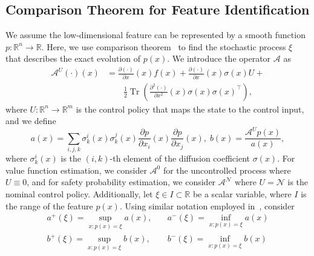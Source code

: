 \documentclass[letterpaper]{article} %
\begin{document}
\subsection{Comparison Theorem for Feature Identification}
We assume the low-dimensional feature can be represented by a smooth function $p: \mathbb{R}^n \rightarrow \mathbb{R}$. Here, we use comparison theorem~\cite[Theorem 3.1]{ikeda1977comparison} to find the stochastic process $\xi$ that describes the exact evolution of $p(x)$.
We introduce the operator $\mathcal{A}$ as
\begin{equation}
\label{eq:def_L}
\begin{aligned}
\mathcal{A}^U(\cdot)(x) & =\frac{\partial(\cdot)}{\partial x}(x) f(x)+ \frac{\partial (\cdot)}{\partial x}(x) \sigma(x) U + \\
& \qquad \frac{1}{2} \operatorname{Tr}\left(\frac{\partial^2(\cdot)}{\partial x^2}(x) \sigma(x) \sigma(x)^\top\right),
\end{aligned}
\end{equation}
where $U: \mathbb{R}^n \rightarrow \mathbb{R}^m$ is the control policy that maps the state to the control input, and we define
\begin{equation}
    a(x)=\sum_{i, j, k} \sigma_k^i(x) \sigma_k^j(x) \frac{\partial p}{\partial x_i}(x) \frac{\partial p}{\partial x_j}(x), \; b(x)=\frac{\mathcal{A}^U p(x)}{a(x)},
\end{equation}
where $\sigma_k^i(x)$ is the $(i,k)$-th element of the diffusion coefficient $\sigma(x)$.
For value function estimation, we consider $\mathcal{A}^0$ for the uncontrolled process where $U \equiv 0$, and for safety probability estimation, we consider $\mathcal{A}^{\mathcal{N}}$ where $U = \mathcal{N}$ is the nominal control policy.
Additionally, let $\xi \in I \subset \mathbb{R}$ be a scalar variable, where $I$ is the range of the feature $p(x)$. Using similar notation employed in~\cite{ikeda1977comparison}, consider
\begin{equation}
\label{eq:a_b_def}
\begin{aligned}
    a^{+}(\xi) = \sup _{x: p(x)=\xi} a(x), & \quad a^{-}(\xi) = \inf _{x: p(x)=\xi} a(x) \\
    b^{+}(\xi)= \sup _{x: p(x)=\xi} b(x), & \quad b^{-}(\xi)=\inf _{x: p(x)=\xi} b(x)
\end{aligned}
\end{equation}
\end{document}
